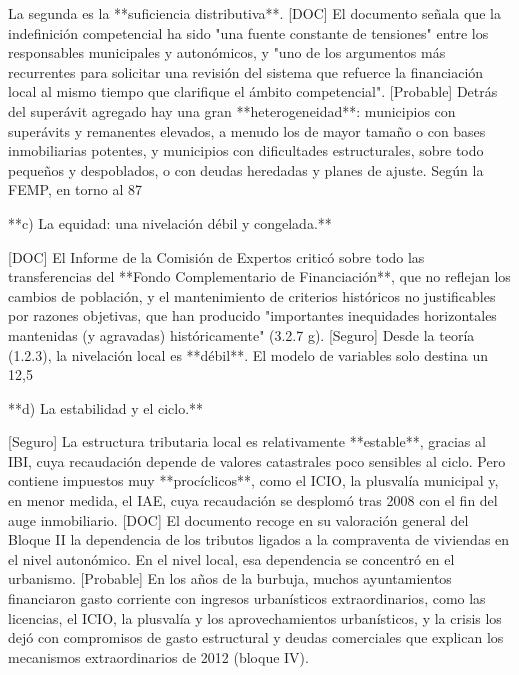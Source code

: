 \documentclass[10pt,a4paper]{article}
\begin{document}
La segunda es la **suficiencia distributiva**. [DOC] El documento señala que la indefinición competencial ha sido "una fuente constante de tensiones" entre los responsables municipales y autonómicos, y "uno de los argumentos más recurrentes para solicitar una revisión del sistema que refuerce la financiación local al mismo tiempo que clarifique el ámbito competencial". [Probable] Detrás del superávit agregado hay una gran **heterogeneidad**: municipios con superávits y remanentes elevados, a menudo los de mayor tamaño o con bases inmobiliarias potentes, y municipios con dificultades estructurales, sobre todo pequeños y despoblados, o con deudas heredadas y planes de ajuste. Según la FEMP, en torno al 87%

**c) La equidad: una nivelación débil y congelada.**

[DOC] El Informe de la Comisión de Expertos criticó sobre todo las transferencias del **Fondo Complementario de Financiación**, que no reflejan los cambios de población, y el mantenimiento de criterios históricos no justificables por razones objetivas, que han producido "importantes inequidades horizontales mantenidas (y agravadas) históricamente" (3.2.7 g). [Seguro] Desde la teoría (1.2.3), la nivelación local es **débil**. El modelo de variables solo destina un 12,5%

**d) La estabilidad y el ciclo.**

[Seguro] La estructura tributaria local es relativamente **estable**, gracias al IBI, cuya recaudación depende de valores catastrales poco sensibles al ciclo. Pero contiene impuestos muy **procíclicos**, como el ICIO, la plusvalía municipal y, en menor medida, el IAE, cuya recaudación se desplomó tras 2008 con el fin del auge inmobiliario. [DOC] El documento recoge en su valoración general del Bloque II la dependencia de los tributos ligados a la compraventa de viviendas en el nivel autonómico. En el nivel local, esa dependencia se concentró en el urbanismo. [Probable] En los años de la burbuja, muchos ayuntamientos financiaron gasto corriente con ingresos urbanísticos extraordinarios, como las licencias, el ICIO, la plusvalía y los aprovechamientos urbanísticos, y la crisis los dejó con compromisos de gasto estructural y deudas comerciales que explican los mecanismos extraordinarios de 2012 (bloque IV).
\end{document}
